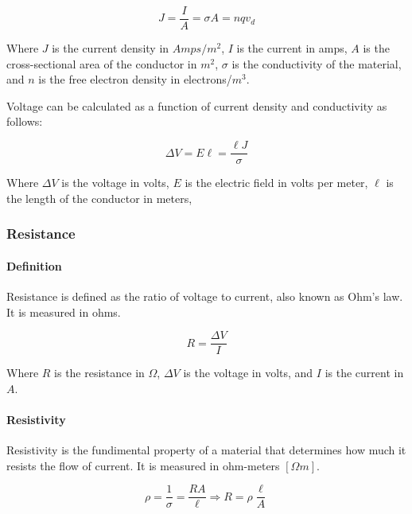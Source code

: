 \begin{equation*}
    J = \frac{I}{A} = \sigma A = nqv_d
\end{equation*}

Where $J$ is the current density in $Amps/m^2$, $I$ is the current in amps, $A$ is the cross-sectional 
area of the conductor in $m^2$, $\sigma$ is the conductivity of the material, and $n$ is the free electron 
density in electrons/$m^3$.

\pagebreak

Voltage can be calculated as a function of current density and conductivity as follows:

\begin{equation*}
    \Delta V = E\ell = \frac{\ell J}{\sigma}
\end{equation*}

Where $\Delta V$ is the voltage in volts, $E$ is the electric field in volts per meter, $\ell$ is the length of the conductor in meters,


\hrulefill


\subsubsection*{Resistance}

\paragraph*{Definition}
Resistance is defined as the ratio of voltage to current, also known as Ohm's law. It is measured in ohms.

\begin{equation*}
    R = \frac{\Delta V}{I}
\end{equation*}

Where $R$ is the resistance in $\Omega$, $\Delta V$ is the voltage in volts, and $I$ is the current in $A$.


\paragraph*{Resistivity}
Resistivity is the fundimental property of a material that determines how much it resists the flow of current. 
It is measured in ohm-meters $[\Omega m]$.

\begin{equation*}
    \rho = \frac{1}{\sigma} = \frac{RA}{\ell} \Longrightarrow R = \rho \frac{\ell}{A}
\end{equation*}

